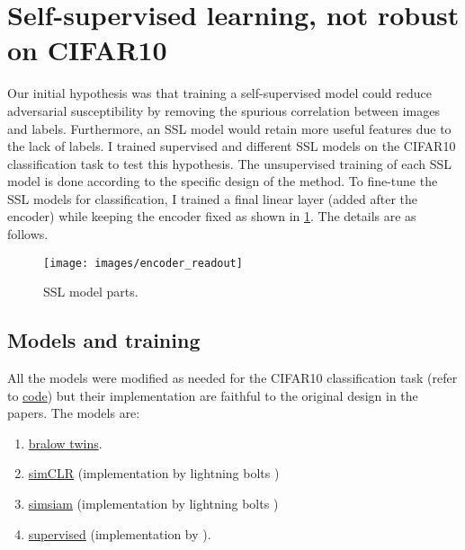 \documentclass[../thesis.tex]{subfiles}
\begin{document}
	
	
	\section{Self-supervised learning, not robust on CIFAR10 }
	\label{sec:SSL_experiments_cifar10}
	
	Our initial hypothesis was that training a self-supervised model could reduce adversarial susceptibility by removing the spurious correlation between images and labels. Furthermore, an SSL model would retain more useful features due to the lack of labels. I trained supervised and different SSL models on the CIFAR10 classification task to test this hypothesis. The unsupervised training of each SSL model is done according to the specific design of the method. To fine-tune the SSL models for classification, I trained a final linear layer (added after the encoder) while keeping the encoder fixed as shown in \ref{fig:encoderreadout}. The details are as follows.
	
	
	\begin{figure}
		\centering
		\texttt{[image: images/encoder\_readout]}
		\caption{SSL model parts.}
		\label{fig:encoderreadout}
	\end{figure}
	
	\subsection{Models and training}
	All the models were modified as needed for the CIFAR10 classification task (refer to \href{https://github.com/LIONS-EPFL/adversarial-components}{code}) but their implementation are faithful to the original design in the papers. The models are:
	\begin{enumerate}
		\item \href{https://github.com/yaohungt/Barlow-Twins-HSIC}{bralow twins}.
		
		\item \href{https://pytorch-lightning-bolts.readthedocs.io/en/latest/self_supervised_models.html}{simCLR} (implementation by lightning bolts \cite{bolts})
		
		\item \href{https://pytorch-lightning-bolts.readthedocs.io/en/latest/self_supervised_models.html}{simsiam} (implementation by lightning bolts \cite{bolts})
		
		\item \href{https://github.com/huyvnphan/PyTorch_CIFAR10}{supervised} (implementation by \cite{huy_phan_2021_4431043}).
		
	\end{enumerate}
	
\end{document}
